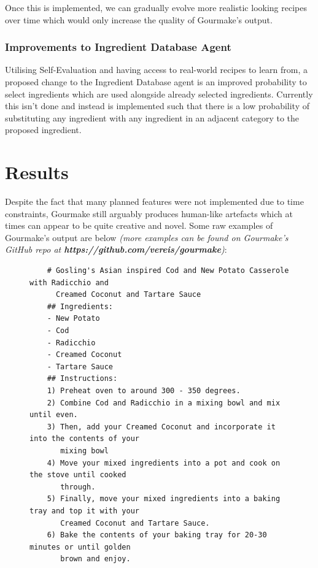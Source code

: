 \documentclass[9pt,titlepage,a4paper]{extarticle}
\begin{document}
    Once this is implemented, we can gradually evolve more realistic looking recipes over time which would only increase
    the quality of Gourmake's output.

\subsubsection{Improvements to Ingredient Database Agent}
    Utilising Self-Evaluation and having access to real-world recipes to learn from, a proposed change to the Ingredient Database
    agent is an improved probability to select ingredients which are used alongside already selected ingredients. Currently
    this isn't done and instead is implemented such that there is a low probability of substituting any ingredient with
    any ingredient in an adjacent category to the proposed ingredient.

\section{Results}
    Despite the fact that many planned features were not implemented due to time constraints, Gourmake still arguably produces
    human-like artefacts which at times can appear to be quite creative and novel. Some raw examples of Gourmake's output are
    below \textit{(more examples can be found on Gourmake's GitHub repo at \textbf{https://github.com/vereis/gourmake})}:
    \\
    \begin{figure}[H]
        \begin{verbatim}
    # Gosling's Asian inspired Cod and New Potato Casserole with Radicchio and 
      Creamed Coconut and Tartare Sauce                                            
    ## Ingredients:
    - New Potato
    - Cod
    - Radicchio
    - Creamed Coconut                                                                                                                        
    - Tartare Sauce                                                                                                                          
    ## Instructions:                                                                                                                         
    1) Preheat oven to around 300 - 350 degrees.                                                                                             
    2) Combine Cod and Radicchio in a mixing bowl and mix until even.                                                            
    3) Then, add your Creamed Coconut and incorporate it into the contents of your 
       mixing bowl                                                
    4) Move your mixed ingredients into a pot and cook on the stove until cooked 
       through.                                                    
    5) Finally, move your mixed ingredients into a baking tray and top it with your 
       Creamed Coconut and Tartare Sauce.
    6) Bake the contents of your baking tray for 20-30 minutes or until golden 
       brown and enjoy.
        \end{verbatim}
    \end{figure}
\end{document}
